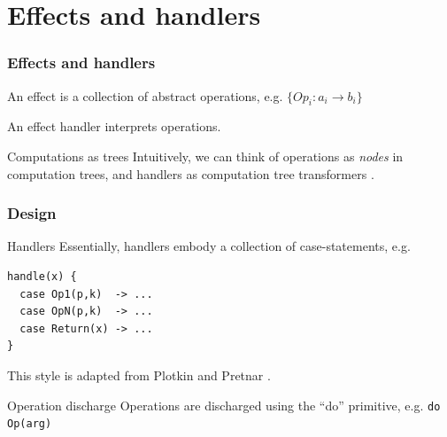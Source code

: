 \section{Effects and handlers}
\begin{frame}
  \frametitle{Effects and handlers}
  \begin{definition}
    An effect is a collection of abstract operations, e.g. 
    $\{ Op_i : a_i \to b_i \}$
  \end{definition}
  \begin{definition}
    An effect handler interprets operations.
  \end{definition}
  \begin{block}{Computations as trees}
    Intuitively, we can think of operations as \emph{nodes} in computation trees, and handlers as computation tree transformers \cite{Lindley14}.
  \end{block}
\end{frame}


\begin{frame}[fragile]
  \frametitle{Design}
  \begin{block}{Handlers}
    Essentially, handlers embody a collection of case-statements, e.g.
\begin{lstlisting}[basicstyle=\ttfamily]
handle(x) {
  case Op1(p,k)  -> ...
  case OpN(p,k)  -> ...
  case Return(x) -> ...
} 
\end{lstlisting}
This style is adapted from Plotkin and Pretnar \cite{Plotkin13,Kammar13}.
  \end{block}
  \begin{block}{Operation discharge}
    Operations are discharged using the ``do'' primitive, e.g.
    \texttt{do Op(arg)}
  \end{block}
\end{frame}

